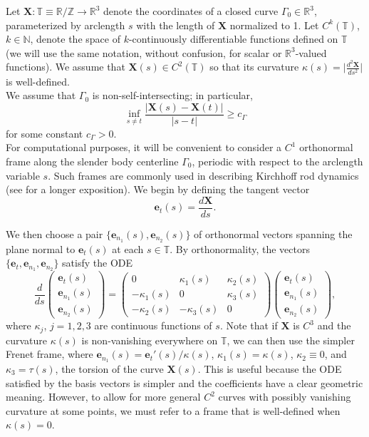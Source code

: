 \documentclass[11pt]{article}
\numberwithin{equation}{section}
\newcommand{\R}{\mathbb{R}}
\newcommand{\Z}{\mathbb{Z}}
\newcommand{\N}{\mathbb{N}}
\newcommand{\T}{\mathbb{T}}
\newcommand{\X}{\bm{X}}
\newcommand{\be}{\bm{e}}
\theoremstyle{definition}
\begin{document}
Let $\X: \T \equiv \R/\Z \to \R^3$ denote the coordinates of a closed curve $\Gamma_0\in \R^3$, parameterized by arclength $s$ with the length of $\X$ normalized to 1. Let $C^k(\T)$, $k\in \N$, denote the space of $k$-continuously differentiable functions defined on $\T$ (we will use the same notation, without confusion, for scalar or $\R^3$-valued functions). We assume that $\X(s)\in C^2(\T)$ so that its curvature $\kappa(s) = \big| \frac{d^2\X}{d s^2} \big|$ is well-defined. \\

We assume that $\Gamma_0$ is non-self-intersecting; in particular, 
\begin{equation}\label{non_intersecting}
\inf_{s\neq t}\frac{|\X(s)-\X(t)|}{|s-t|} \ge c_{\Gamma}
\end{equation}
for some constant $c_{\Gamma}>0$. \\

For computational purposes, it will be convenient to consider a $C^1$ orthonormal frame along the slender body centerline $\Gamma_0$, periodic with respect to the arclength variable $s$. Such frames are commonly used in describing Kirchhoff rod dynamics (see \cite{antman2005nonlinear, goriely1997nonlinear} for a longer exposition). We begin by defining the tangent vector
\[\be_t(s)=\frac{d \X}{ds}. \]

We then choose a pair $\{\be_{n_1}(s),\be_{n_2}(s)\}$ of orthonormal vectors spanning the plane normal to $\be_t(s)$ at each $s\in \T$. By orthonormality, the vectors $\{\be_t,\be_{n_1},\be_{n_2}\}$ satisfy the ODE 
\begin{equation}\label{moving_ODE}
\frac{d}{ds}\begin{pmatrix}
\be_t(s) \\
\be_{n_1}(s) \\
\be_{n_2}(s) 
\end{pmatrix} = \begin{pmatrix}
0 & \kappa_1(s) & \kappa_2(s) \\
-\kappa_1(s) & 0 & \kappa_3(s) \\
-\kappa_2(s) & -\kappa_3(s) & 0 
\end{pmatrix} \begin{pmatrix}
\be_t(s) \\
\be_{n_1}(s) \\
\be_{n_2}(s) 
\end{pmatrix},
\end{equation}
where $\kappa_j$, $j=1,2,3$ are continuous functions of $s$. Note that if $\X$ is $C^3$ and the curvature $\kappa(s)$ is non-vanishing everywhere on $\T$, we can then use the simpler Frenet frame, where $\be_{n_1}(s) = \be_t'(s)/\kappa(s)$, $\kappa_1(s)=\kappa(s)$, $\kappa_2\equiv 0$, and $\kappa_3=\tau(s)$, the torsion of the curve $\X(s)$. This is useful because the ODE satisfied by the basis vectors is simpler and the coefficients have a clear geometric meaning. However, to allow for more general $C^2$ curves with possibly vanishing curvature at some points, we must refer to a frame that is well-defined when $\kappa(s)=0$.  \\
\end{document}
